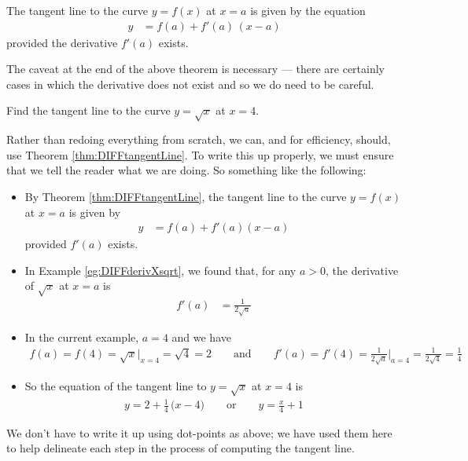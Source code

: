 \begin{theorem}\label{thm:DIFFtangentLine}
 The tangent line to the curve $y=f(x)$ at $x=a$ is given by the equation
\begin{align*}
  y &= f(a) + f'(a) \, (x-a)
\end{align*}
provided the derivative $f'(a)$ exists.
\end{theorem}
The caveat at the end of the above theorem is necessary --- there are certainly cases in
which the derivative does not exist and so we do need to be careful.




\begin{eg}\label{eg:DIFFtangentA}
Find the tangent line to the curve $y=\sqrt{x}$ at $x=4$.


Rather than redoing everything from scratch, we can, and for
efficiency, should, use Theorem \ref{thm:DIFFtangentLine}.
To write this up properly, we must ensure that  we tell the reader
what we are doing. So something like the following:

\begin{itemize}
 \item By Theorem \ref{thm:DIFFtangentLine}, the tangent line to the curve
$y=f(x)$ at $x=a$ is given by
\begin{align*}
  y &= f(a) + f'(a) (x-a)
\end{align*}
provided $f'(a)$ exists.
\item In Example \ref{eg:DIFFderivXsqrt}, we found that, for any $a>0$, the derivative of
$\sqrt{x}$ at $x=a$ is
\begin{align*}
  f'(a) &= \frac{1}{2\sqrt{a}}
\end{align*}
\item In the current example, $a=4$ and we have
\begin{align*}
f(a)=f(4)=\sqrt{x}\big|_{x=4}=\sqrt{4}=2\qquad\text{and}\qquad
f'(a)=f'(4)=\frac{1}{2\sqrt{a}}\Big|_{a=4}=\frac{1}{2\sqrt{4}}=\frac{1}{4}
\end{align*}
\item So the equation of the tangent line to $y=\sqrt{x}$ at $x=4$ is
\begin{align*}
y= 2+\frac{1}{4}\,\big(x-4\big)\qquad\text{or}\qquad
y=\frac{x}{4}+1
\end{align*}
\end{itemize}
We don't have to write it up using dot-points as above; we have used them here to help
delineate each step in the process of computing the tangent line.
\end{eg}



